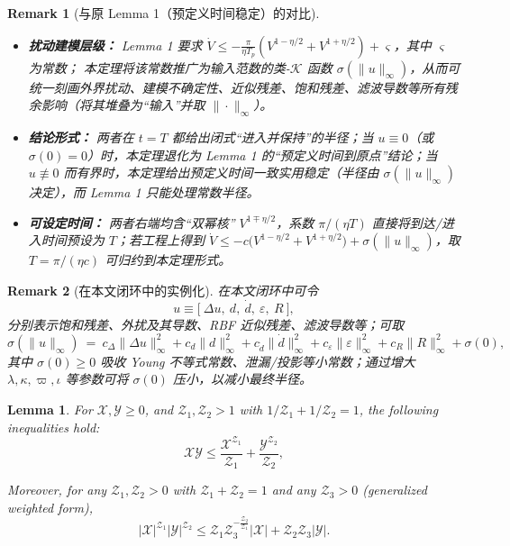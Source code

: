 \documentclass[pdflatex,sn-mathphys-num]{sn-jnl}%
\theoremstyle{thmstyleone}%
\newtheorem{lemma}{Lemma}
\theoremstyle{thmstyletwo}%
\newtheorem{remark}{Remark}%
\theoremstyle{thmstylethree}%
\begin{document}
	\begin{remark}[与原 Lemma 1（预定义时间稳定）的对比]
	\begin{itemize}
	  \item \textbf{扰动建模层级：} Lemma 1 要求
	  $\dot V \le -\frac{\pi}{\eta T_p}(V^{1-\eta/2}+V^{1+\eta/2})+\varsigma$，其中 $\varsigma$ 为常数；
	  本定理将该常数推广为输入范数的类-$\mathcal{K}$ 函数 $\sigma(\|u\|_\infty)$，从而可统一刻画外界扰动、建模不确定性、近似残差、饱和残差、滤波导数等所有残余影响（将其堆叠为“输入”并取 $\|\cdot\|_\infty$）。
	  \item \textbf{结论形式：} 两者在 $t=T$ 都给出闭式“进入并保持”的半径；当 $u\equiv0$（或 $\sigma(0)=0$）时，本定理退化为 Lemma 1 的“预定义时间到原点”结论；当 $u\not\equiv0$ 而有界时，本定理给出预定义时间一致实用稳定（半径由 $\sigma(\|u\|_\infty)$ 决定），而 Lemma 1 只能处理常数半径。
	  \item \textbf{可设定时间：} 两者右端均含“双幂核” $V^{1\mp\eta/2}$，系数 $\pi/(\eta T)$ 直接将到达/进入时间预设为 $T$；若工程上得到
	  $\dot V\le -c\big(V^{1-\eta/2}+V^{1+\eta/2}\big)+\sigma(\|u\|_\infty)$，取 $T=\pi/(\eta c)$ 可归约到本定理形式。
	\end{itemize}
	\end{remark}
	
	\begin{remark}[在本文闭环中的实例化]
	在本文闭环中可令
	\[
	u \equiv \big[\ \Delta u,\ d,\ \dot d,\ \varepsilon,\ R\ \big],
	\]
	分别表示饱和残差、外扰及其导数、RBF 近似残差、滤波导数等；可取
	\[
	\sigma(\|u\|_\infty)\ =\ c_\Delta\|\Delta u\|_\infty^2
	+c_d\|d\|_\infty^2
	+c_{\dot d}\|\dot d\|_\infty^2
	+c_\varepsilon\|\varepsilon\|_\infty^2
	+c_R\|R\|_\infty^2
	+\sigma(0),
	\]
	其中 $\sigma(0)\ge0$ 吸收 Young 不等式常数、泄漏/投影等小常数；通过增大 $\lambda,\kappa,\varpi,\iota$ 等参数可将 $\sigma(0)$ 压小，以减小最终半径。
	\end{remark}
	







\begin{lemma}	\label{lemma:2} \cite{TeeEtAl_2009_Barrierlyapunova} For $\mathcal{X}, \mathcal{Y}  \geq 0$, and $ \mathcal{Z}_1 ,  \mathcal{Z}_2> 1$ with ${1}/{ \mathcal{Z}_1} + {1}/{ \mathcal{Z}_2} = 1$, the following inequalities hold:
	\begin{equation}\label{eq:9}
		\mathcal{X} \mathcal{Y}  \leq \frac{\mathcal{X}^{ \mathcal{Z}_1}}{ \mathcal{Z}_1} + \frac{\mathcal{Y} ^{ \mathcal{Z}_2}}{ \mathcal{Z}_2},
	\end{equation}
	 
	Moreover, for any $\mathcal{Z}_{1},\mathcal{Z}_{2}>0$ with $\mathcal{Z}_{1}+\mathcal{Z}_{2}=1$ and any $\mathcal{Z}_{3}>0$ (generalized weighted form),
	\begin{equation}\label{eq:10}
		|\mathcal{X}|^{ \mathcal{Z}_{1}}|\mathcal{Y} |^{ \mathcal{Z}_{2}}\leq  \mathcal{Z}_{1} \mathcal{Z}_{3}^{-\frac{ \mathcal{Z}_{2}}{ \mathcal{Z}_{1}}}|\mathcal{X}|+ \mathcal{Z}_{2}  \mathcal{Z}_{3}|\mathcal{Y} |.
	\end{equation} 
\end{lemma}  
\end{document}
